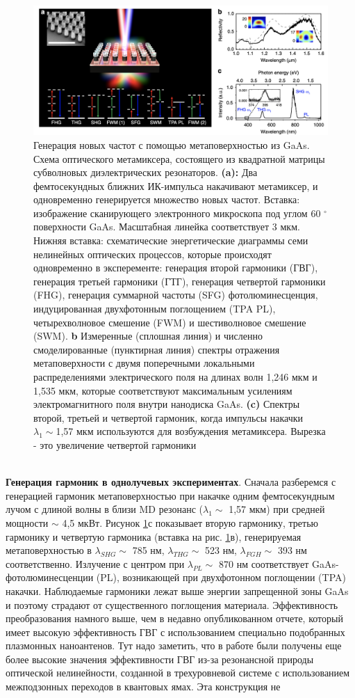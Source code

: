 \begin{figure}[h!]
	\centering
	\includegraphics[width=0.7\linewidth]{images/mixer.png}
	\caption{Генерация новых частот с помощью метаповерхностью из  GaAs. Схема оптического метамиксера, состоящего из квадратной матрицы субволновых диэлектрических резонаторов. \textbf{(a):} Два фемтосекундных ближних ИК-импульса накачивают метамиксер, и одновременно генерируется множество новых частот. Вставка: изображение сканирующего электронного микроскопа под углом 60 $^\circ$ поверхности GaAs. Масштабная линейка соответствует 3 мкм. Нижняя вставка: схематические энергетические диаграммы семи нелинейных оптических процессов, которые происходят одновременно в эксперементе: генерация второй гармоники (ГВГ), генерация третьей гармоники (ГТГ), генерация четвертой гармоники (FHG), генерация суммарной частоты (SFG) фотолюминесценция, индуцированная двухфотонным поглощением (TPA PL), четырехволновое смешение (FWM) и шестиволновое смешение (SWM). \textbf{b} Измеренные (сплошная линия) и численно смоделированные (пунктирная линия) спектры отражения метаповерхности с двумя поперечными локальными распределениями электрического поля на длинах волн 1,246 мкм и 1,535 мкм, которые соответствуют максимальным усилениям электромагнитного поля внутри нанодиска GaAs. \textbf{(c)} Спектры второй, третьей и четвертой гармоник, когда импульсы накачки $\lambda_1 \sim $1,57 мкм используются для возбуждения метамиксера. Вырезка - это увеличение четвертой гармоники}
	\label{mixerPictr1}
\end{figure}
\\
\hspace*{2mm}
\textbf{Генерация гармоник в однолучевых экспериментах}. Сначала разберемся с генерацией гармоник метаповерхностью при накачке одним фемтосекундным лучом с длиной волны в близи MD резонанс ($\lambda_1 \sim$ 1,57 мкм) при средней мощности $\sim$ 4,5 мкВт. Рисунок \ref{mixerPictr1}с показывает вторую гармонику, третью гармонику и четвертую гармоника (вставка на рис. \ref{mixerPictr1}в), генерируемая метаповерхностью в $\lambda_{SHG} \sim$ 785 нм, $\lambda_{THG} \sim$ 523 нм, $\lambda_{FGH} \sim$ 393 нм соответственно. Излучение с центром при $\lambda_{PL} \sim$ 870 нм соответствует GaAs-фотолюминесценции (PL), возникающей при двухфотонном поглощении (TPA) накачки. Наблюдаемые гармоники лежат выше энергии запрещенной зоны GaAs и поэтому страдают от существенного поглощения материала. Эффективность преобразования намного выше, чем в недавно опубликованном отчете, который имеет высокую эффективность ГВГ с использованием специально подобранных плазмонных наноантенов. Тут надо заметить, что в работе \cite{wolf2015phased} были получены еще более высокие значения эффективности ГВГ из-за резонансной природы оптической нелинейности, созданной в трехуровневой системе с использованием межподзонных переходов в квантовых ямах. Эта конструкция не 
